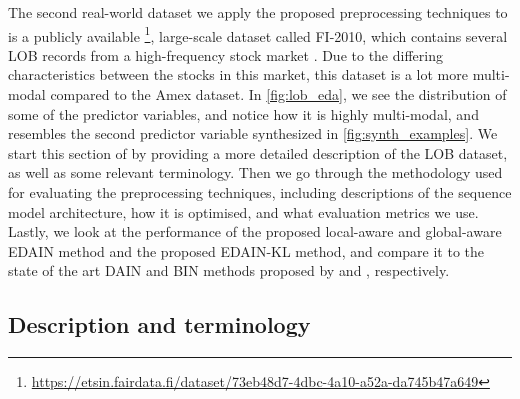 \documentclass{statsmsc}
\begin{document}
{The second real-world dataset we apply the proposed preprocessing techniques to
is a publicly available%
\footnote{\url{https://etsin.fairdata.fi/dataset/73eb48d7-4dbc-4a10-a52a-da745b47a649}},
large-scale dataset called FI-2010, which contains several \ac{LOB} records from
a high-frequency stock market \citep{lob-data}.
Due to the differing characteristics between the stocks in this market, this dataset is a lot
more multi-modal compared to the Amex dataset. In \cref{fig:lob_eda}, we see the distribution of
some of the predictor variables, and notice how it is highly multi-modal, and resembles the
second predictor variable synthesized in \cref{fig:synth_examples}.
We start this section of by providing a more detailed description of the \ac{LOB} dataset,
as well as some relevant terminology. Then we go through the methodology used for evaluating
the preprocessing techniques, including descriptions of the sequence model  architecture,
how it is optimised, and what evaluation metrics we use. Lastly, we look at the performance
of the proposed local-aware and global-aware \ac{EDAIN}  method and the proposed \ac{EDAIN-KL}
method, and compare it to the state of the art \ac{DAIN} and \ac{BIN} methods proposed
by \cite{dain} and \cite{bin}, respectively.


\subsection{Description and terminology}%
\label{sub:Description}

}
\end{document}
